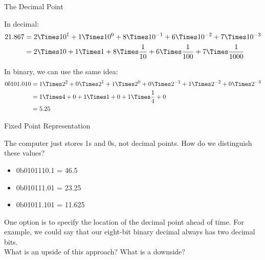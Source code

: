 \begin{frame}{The Decimal Point}

	In decimal:
	\begin{align*}
		21.867 & = 2 \Times 10^1 + 1 \Times 10^0 + 8 \Times 10^{-1} + 6 \Times 10^{-2} + 7 \Times 10^{-3}             \\
		       & =2 \Times 10 + 1 \Times 1 + 8 \Times \frac{1}{10} + 6 \Times \frac{1}{100} + 7 \Times \frac{1}{1000} \\
	\end{align*}

	In binary, we can use the same idea:
	\begin{align*}
		0b101.010 & = 1 \Times 2^2 + 0 \Times 2^1 + 1 \Times 2^0 + 0 \Times 2^{-1} + 1 \Times 2^{-2} + 0 \Times 2^{-3} \\
		          & = 1 \Times 4 + 0 + 1 \Times 1 + 0 + 1 \Times \frac{1}{4} + 0                                       \\
		          & = 5.25                                                                                             \\
	\end{align*}

\end{frame}

\begin{frame}{Fixed Point Representation}

	The computer just stores 1s and 0s, not decimal points. How do we distinguish
	these values?
	\begin{itemize}
		\item 0b0101110.1 = 46.5
		\item 0b010111.01 = 23.25
		\item 0b01011.101 = 11.625
	\end{itemize}

	One option is to specify the location of the decimal point ahead of time. For
	example, we could say that our eight-bit binary decimal always has two decimal
	bits. \\

	What is an upside of this approach? What is a downside?

\end{frame}

